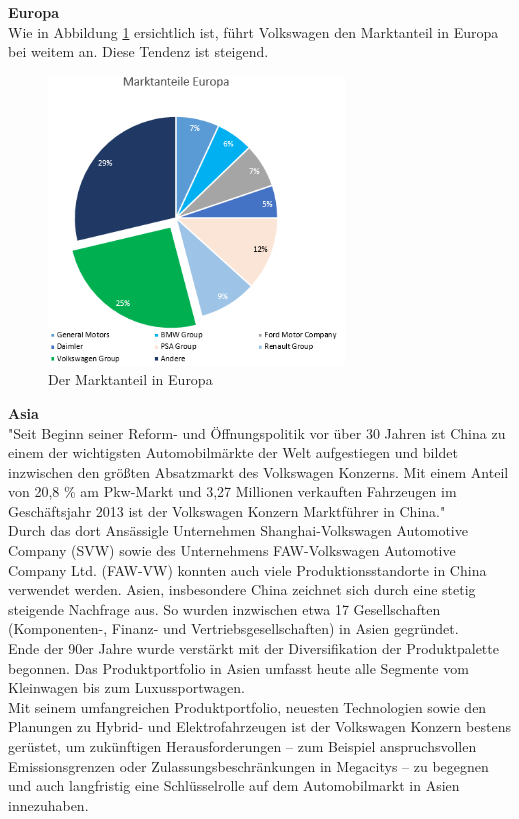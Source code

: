 \documentclass[12pt]{article}
\begin{document}
\noindent
\textbf{Europa}\\
Wie in Abbildung \ref{fig:markteuropa} ersichtlich ist, führt Volkswagen den Marktanteil in Europa bei weitem an. Diese Tendenz ist steigend.
\begin{figure}[here!]
\centering
\includegraphics[width=0.7\textwidth]{images/maie}
\caption{Der Marktanteil in Europa}
\label{fig:markteuropa}
\end{figure}\FloatBarrier
\noindent
\textbf{Asia}\\
"Seit Beginn seiner Reform- und Öffnungspolitik vor über 30 Jahren ist China zu einem der wichtigsten Automobilmärkte der Welt aufgestiegen und bildet inzwischen den größten Absatzmarkt des Volkswagen Konzerns. Mit einem Anteil von 20,8 \% am Pkw-Markt und 3,27 Millionen verkauften Fahrzeugen im Geschäftsjahr 2013 ist der Volkswagen Konzern Marktführer in China."\cite{vwwebsitechina}\\
Durch das dort Ansässigle Unternehmen  Shanghai-Volkswagen Automotive Company (SVW) sowie des Unternehmens FAW-Volkswagen Automotive Company Ltd. (FAW-VW) konnten auch viele Produktionsstandorte in China verwendet werden.
Asien, insbesondere China zeichnet sich durch eine stetig steigende Nachfrage aus. So wurden inzwischen etwa 17 Gesellschaften (Komponenten-, Finanz- und Vertriebsgesellschaften) in Asien gegründet. \\
Ende der 90er Jahre wurde verstärkt mit der Diversifikation der Produktpalette begonnen. Das  Produktportfolio in Asien umfasst heute alle Segmente vom Kleinwagen bis zum Luxussportwagen.
\\
Mit seinem umfangreichen Produktportfolio, neuesten Technologien sowie den Planungen zu Hybrid- und Elektrofahrzeugen ist der Volkswagen Konzern bestens gerüstet, um zukünftigen Herausforderungen – zum Beispiel anspruchsvollen Emissionsgrenzen oder Zulassungsbeschränkungen in Megacitys – zu begegnen und auch langfristig eine Schlüsselrolle auf dem Automobilmarkt in Asien innezuhaben. \\ \\
\end{document}
